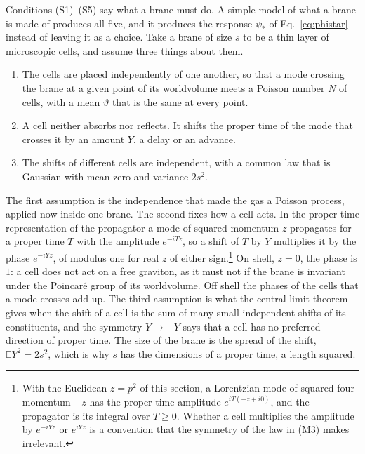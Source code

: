 \documentclass[a4paper,11pt]{article}
\newcommand{\bE}{\mathbb{E}}
\begin{document}
Conditions (S1)--(S5) say what a brane must do. A simple model of what a brane is made of produces all five, and it produces the response $\psi_*$ of Eq.~\eqref{eq:phistar} instead of leaving it as a choice. Take a brane of size $s$ to be a thin layer of microscopic cells, and assume three things about them.
\begin{enumerate}[label=\textup{(M\arabic*)},leftmargin=2.4em,itemsep=0.15em]
\item The cells are placed independently of one another, so that a mode crossing the brane at a given point of its worldvolume meets a Poisson number $N$ of cells, with a mean $\vartheta$ that is the same at every point.
\item A cell neither absorbs nor reflects. It shifts the proper time of the mode that crosses it by an amount $Y$, a delay or an advance.
\item The shifts of different cells are independent, with a common law that is Gaussian with mean zero and variance $2s^2$.
\end{enumerate}
The first assumption is the independence that made the gas a Poisson process, applied now inside one brane. The second fixes how a cell acts. In the proper-time representation of the propagator a mode of squared momentum $z$ propagates for a proper time $T$ with the amplitude $e^{-iTz}$, so a shift of $T$ by $Y$ multiplies it by the phase $e^{-iYz}$, of modulus one for real $z$ of either sign.\footnote{With the Euclidean $z=p^2$ of this section, a Lorentzian mode of squared four-momentum $-z$ has the proper-time amplitude $e^{iT(-z+i0)}$, and the propagator is its integral over $T\ge0$. Whether a cell multiplies the amplitude by $e^{-iYz}$ or $e^{iYz}$ is a convention that the symmetry of the law in (M3) makes irrelevant.} On shell, $z=0$, the phase is $1$: a cell does not act on a free graviton, as it must not if the brane is invariant under the Poincar\'e group of its worldvolume. Off shell the phases of the cells that a mode crosses add up. The third assumption is what the central limit theorem gives when the shift of a cell is the sum of many small independent shifts of its constituents, and the symmetry $Y\to-Y$ says that a cell has no preferred direction of proper time. The size of the brane is the spread of the shift, $\bE Y^2=2s^2$, which is why $s$ has the dimensions of a proper time, a length squared.
\end{document}
